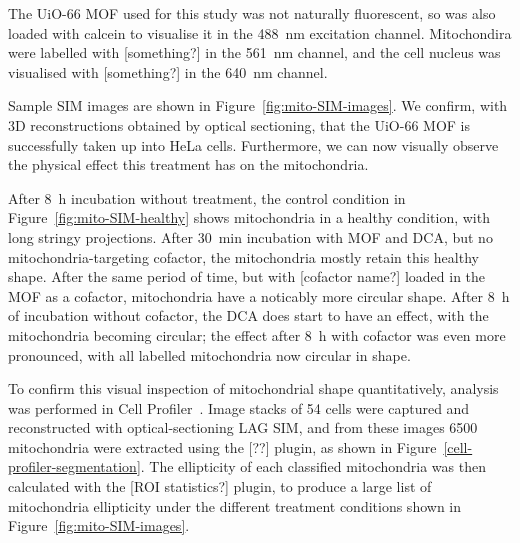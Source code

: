 The UiO-66 MOF used for this study was not naturally fluorescent, so was also loaded with calcein to visualise it in the \SI{488}{\nano\metre} excitation channel. 
Mitochondira were labelled with [something?] in the \SI{561}{\nano\metre} channel, and the cell nucleus was visualised with [something?] in the \SI{640}{\nano\metre} channel. 

Sample SIM images are shown in Figure~\ref{fig:mito-SIM-images}. 
We confirm, with 3D reconstructions obtained by optical sectioning, that the UiO-66 MOF is successfully taken up into HeLa cells. %
Furthermore, we can now visually observe the physical effect this treatment has on the mitochondria. 

After \SI{8}{\hour} incubation without treatment, the control condition in Figure~\ref{fig:mito-SIM-healthy} shows mitochondria in a healthy condition, with long stringy projections. 
After \SI{30}{\minute} incubation with MOF and DCA, but no mitochondria-targeting cofactor, the mitochondria mostly retain this healthy shape. 
After the same period of time, but with [cofactor name?] loaded in the MOF as a cofactor, mitochondria have a noticably more circular shape. 
After \SI{8}{\hour} of incubation without cofactor, the DCA does start to have an effect, with the mitochondria becoming circular; the effect after \SI{8}{\hour} with cofactor was even more pronounced, with all labelled mitochondria now circular in shape. 


To confirm this visual inspection of mitochondrial shape quantitatively, analysis was performed in Cell Profiler~\cite{carpenter2006cellprofiler}.
Image stacks of 54 cells were captured and reconstructed with optical-sectioning LAG SIM, and from these images \num{6500} mitochondria were extracted using the [??] plugin, as shown in Figure~\ref{cell-profiler-segmentation}. 
The ellipticity of each classified mitochondria was then calculated with the [ROI statistics?] plugin, to produce a large list of mitochondria ellipticity under the different treatment conditions shown in Figure~\ref{fig:mito-SIM-images}. 


